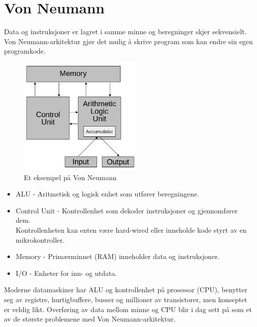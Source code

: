 \documentclass[a4paper, 10pt]{article}
\begin{document}
\section{Von Neumann}
Data og instruksjoner er lagret i samme minne og beregninger skjer sekvensielt. Von Neumann-arkitektur gjør det mulig å skrive program som kan endre sin egen programkode.

\begin{figure}[hbt]
    \begin{center}
        \includegraphics[width=6cm] {img/vonneumann.png}
        \caption{Et eksempel på Von Neumann}
    \end{center}
\end{figure}

\begin{itemize}
	\item ALU - Aritmetisk og logisk enhet som utfører beregningene.
	\item Control Unit - Kontrollenhet som dekoder instruksjoner og gjennomfører dem. \\ Kontrollenheten kan enten være hard-wired eller inneholde kode styrt av en mikrokontroller.
	\item Memory - Primærminnet (RAM) inneholder data og instruksjoner.
	\item I/O - Enheter for inn- og utdata.
	
\end{itemize}

Moderne datamaskiner har ALU og kontrollenhet på prosessor (CPU), benytter seg av registre, hurtigbuffere, busser og millioner av transistorer, men konseptet er veldig likt. Overføring av data mellom minne og CPU blir i dag sett på som et av de største problemene med Von Neumann-arkitektur.
\end{document}
